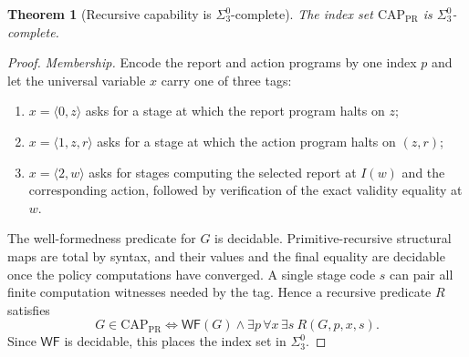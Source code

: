 \documentclass[11pt]{article}
\theoremstyle{plain}
\newtheorem{theorem}{Theorem}[section]
\theoremstyle{definition}
\theoremstyle{remark}
\begin{document}
\begin{theorem}[Recursive capability is $\Sigma^0_3$-complete]\label{thm:AH}
The index set $\mathrm{CAP}_{\mathrm{PR}}$ is $\Sigma^0_3$-complete.
\end{theorem}

\begin{proof}
\emph{Membership.} Encode the report and action programs by one index $p$ and
let the universal variable $x$ carry one of three tags:
\begin{enumerate}[label=(\alph*)]
\item $x=\langle0,z\rangle$ asks for a stage at which the report program halts
on $z$;
\item $x=\langle1,z,r\rangle$ asks for a stage at which the action program
halts on $(z,r)$;
\item $x=\langle2,w\rangle$ asks for stages computing the selected report at
$I(w)$ and the corresponding action, followed by verification of the exact
validity equality at $w$.
\end{enumerate}
The well-formedness predicate for $G$ is decidable. Primitive-recursive
structural maps are total by syntax, and their values and the final equality are
decidable once the policy computations have converged. A single stage code $s$
can pair all finite computation witnesses needed by the tag. Hence a recursive
predicate $R$ satisfies
\[
G\in\mathrm{CAP}_{\mathrm{PR}}
\iff
\mathsf{WF}(G)\land\exists p\,\forall x\,\exists s\ R(G,p,x,s).
\]
Since $\mathsf{WF}$ is decidable, this places the index set in $\Sigma^0_3$.


\end{proof}
\end{document}
